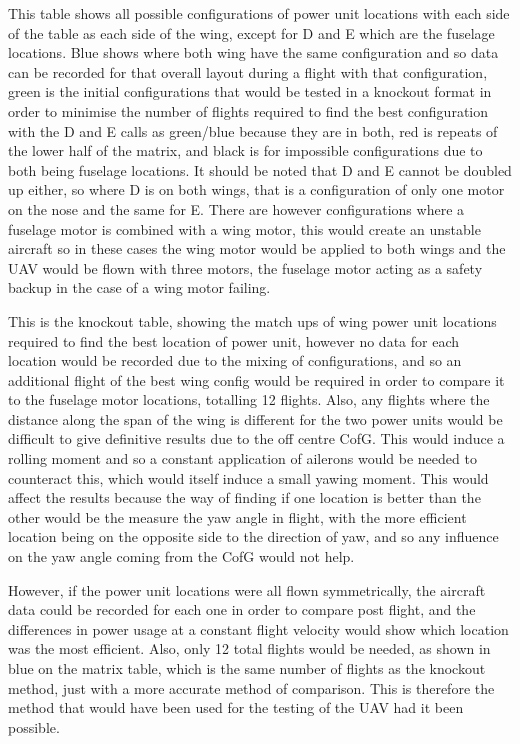 \documentclass[../../main.tex]{subfiles}
\begin{document}
This table shows all possible configurations of power unit locations with each side of the table as each side of the wing, except for D and E which are the fuselage locations.
Blue shows where both wing have the same configuration and so data can be recorded for that overall layout during a flight with that configuration, green is the initial configurations that would be tested in a knockout format in order to minimise the number of flights required to find the best configuration with the D and E calls as green/blue because they are in both, red is repeats of the lower half of the matrix, and black is for impossible configurations due to both being fuselage locations.
It should be noted that D and E cannot be doubled up either, so where D is on both wings, that is a configuration of only one motor on the nose and the same for E.
There are however configurations where a fuselage motor is combined with a wing motor, this would create an unstable aircraft so in these cases the wing motor would be applied to both wings and the UAV would be flown with three motors, the fuselage motor acting as a safety backup in the case of a wing motor failing.


This is the knockout table, showing the match ups of wing power unit locations required to find the best location of power unit, however no data for each location would be recorded due to the mixing of configurations, and so an additional flight of the best wing config would be required in order to compare it to the fuselage motor locations, totalling 12 flights.
Also, any flights where the distance along the span of the wing is different for the two power units would be difficult to give definitive results due to the off centre CofG.
This would induce a rolling moment and so a constant application of ailerons would be needed to counteract this, which would itself induce a small yawing moment.
This would affect the results because the way of finding if one location is better than the other would be the measure the yaw angle in flight, with the more efficient location being on the opposite side to the direction of yaw, and so any influence on the yaw angle coming from the CofG would not help. 

However, if the power unit locations were all flown symmetrically, the aircraft data could be recorded for each one in order to compare post flight, and the differences in power usage at a constant flight velocity would show which location was the most efficient.
Also, only 12 total flights would be needed, as shown in blue on the matrix table, which is the same number of flights as the knockout method, just with a more accurate method of comparison.
This is therefore the method that would have been used for the testing of the UAV had it been possible.  
\end{document}
